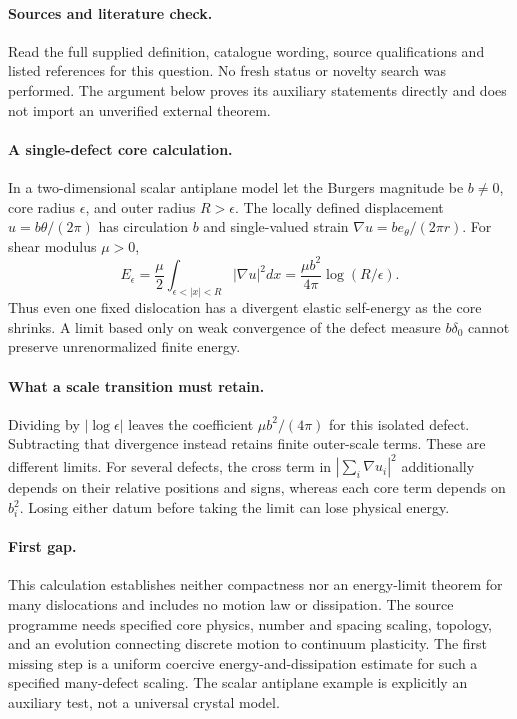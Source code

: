 \documentclass[11pt]{article}
\begin{document}
\paragraph{Sources and literature check.}
Read the full supplied definition, catalogue wording, source qualifications and listed references for this question. No fresh status or novelty search was performed. The argument below proves its auxiliary statements directly and does not import an unverified external theorem.

\paragraph{A single-defect core calculation.} In a two-dimensional scalar antiplane model let the Burgers magnitude be \(b\ne0\), core radius \(\epsilon\), and outer radius \(R>\epsilon\). The locally defined displacement \(u=b\theta/(2\pi)\) has circulation \(b\) and single-valued strain \(\nabla u=b e_\theta/(2\pi r)\). For shear modulus \(\mu>0\),
\[
 E_\epsilon=\frac\mu2\int_{\epsilon<|x|<R}|\nabla u|^2dx
 =\frac{\mu b^2}{4\pi}\log(R/\epsilon).
\]
Thus even one fixed dislocation has a divergent elastic self-energy as the core shrinks. A limit based only on weak convergence of the defect measure \(b\delta_0\) cannot preserve unrenormalized finite energy.
\paragraph{What a scale transition must retain.} Dividing by \(|\log\epsilon|\) leaves the coefficient \(\mu b^2/(4\pi)\) for this isolated defect. Subtracting that divergence instead retains finite outer-scale terms. These are different limits. For several defects, the cross term in \(|\sum_i\nabla u_i|^2\) additionally depends on their relative positions and signs, whereas each core term depends on \(b_i^2\). Losing either datum before taking the limit can lose physical energy.
\paragraph{First gap.} This calculation establishes neither compactness nor an energy-limit theorem for many dislocations and includes no motion law or dissipation. The source programme needs specified core physics, number and spacing scaling, topology, and an evolution connecting discrete motion to continuum plasticity. The first missing step is a uniform coercive energy-and-dissipation estimate for such a specified many-defect scaling. The scalar antiplane example is explicitly an auxiliary test, not a universal crystal model.
\end{document}
